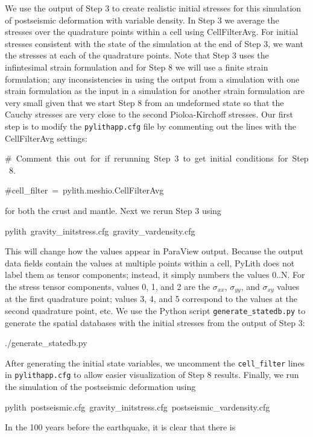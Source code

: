 We use the output of Step 3 to create realistic initial stresses for
this simulation of postseismic deformation with variable density.
In Step 3 we average the stresses over the quadrature points within
a cell using CellFilterAvg. For initial stresses consistent with the
state of the simulation at the end of Step 3, we want the stresses
at each of the quadrature points. Note that Step 3 uses the infintesimal
strain formulation and for Step 8 we will use a finite strain formulation;
any inconsistencies in using the output from a simulation with one
strain formulation as the input in a simulation for another strain
formulation are very small given that we start Step 8 from an undeformed
state so that the Cauchy stresses are very close to the second Pioloa-Kirchoff
stresses. Our first step is to modify the \texttt{pylithapp.cfg} file
by commenting out the lines with the CellFilterAvg settings:
\begin{lyxcode}
\#~Comment~this~out~for~if~rerunning~Step~3~to~get~initial~conditions~for~Step~8.

\#cell\_filter~=~pylith.meshio.CellFilterAvg
\end{lyxcode}
for both the crust and mantle. Next we rerun Step 3 using
\begin{lyxcode}
pylith~gravity\_initstress.cfg~gravity\_vardensity.cfg
\end{lyxcode}
This will change how the values appear in ParaView output. Because
the output data fields contain the values at multiple points within
a cell, PyLith does not label them as tensor components; instead,
it simply numbers the values 0..N. For the stress tensor components,
values 0, 1, and 2 are the $\sigma_{\mathit{xx}}$, $\sigma_{\mathit{yy}}$,
and $\sigma_{\mathit{xy}}$ values at the first quadrature point;
values 3, 4, and 5 correspond to the values at the second quadrature
point, etc. We use the Python script \texttt{generate\_statedb.py}
to generate the spatial databases with the initial stresses from the
output of Step 3:
\begin{lyxcode}
./generate\_statedb.py
\end{lyxcode}
After generating the initial state variables, we uncomment the \texttt{cell\_filter}
lines in \texttt{pylithapp.cfg} to allow easier visualization of Step
8 results. Finally, we run the simulation of the postseismic deformation
using
\begin{lyxcode}
pylith~postseismic.cfg~gravity\_initstress.cfg~postseismic\_vardensity.cfg
\end{lyxcode}
In the 100 years before the earthquake, it is clear that there is
